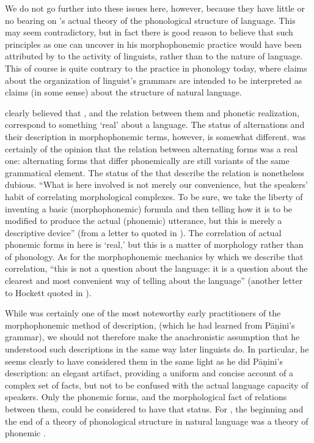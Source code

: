 We do not go further into these issues here, however, because they
have little or no bearing on {\Bloomfield}'s actual theory of the
phonological structure of language. This may seem contradictory, but
in fact there is good reason to believe that such principles as one
can uncover in his morphophonemic practice would have been attributed
by {\Bloomfield} to the activity of linguists, rather than to the nature
of language. This of course is quite contrary to the practice in
phonology today, where claims about the organization of linguist's
grammars are intended to be interpreted as claims (in some sense)
about the structure of natural language.

{\Bloomfield} clearly believed that , and the
relation between them and phonetic realization, correspond to
something `real' about a language. The status of alternations and
their description in morphophonemic terms, however, is somewhat
different. {\Bloomfield} was certainly of the opinion that the relation
between alternating forms was a real one: alternating forms that
differ phonemically are still variants of the same grammatical
element. The status of the  that describe the
relation is nonetheless dubious. ``What is here involved is not merely
our convenience, but the speakers' habit of correlating morphological
complexes. To be sure, we take the liberty of inventing a basic
(morphophonemic) formula and then telling how it is to be modified to
produce the actual (phonemic) utterance, but this is merely a
descriptive device'' (from a letter to {\Hockett} quoted in
\citealt[371]{hockett70:bloomfield.anthology}). The correlation of
actual phonemic forms in  here is `real,' but this is a
matter of morphology rather than of phonology. As for the
morphophonemic mechanics by which we describe that correlation, ``this
is not a question about the language: it is a question about the
clearest and most convenient way of telling about the language''
(another letter to Hockett quoted in
\citealt[375]{hockett70:bloomfield.anthology}).

While {\Bloomfield} was certainly one of the most noteworthy early
practitioners of the morphophonemic method of description, (which he
had learned from Pāṇini's grammar), we should not therefore make the
anachronistic assumption that he understood such descriptions in the
same way later linguists do. In particular, he seems clearly to have
considered them in the same light as he did Pāṇini's description: an
elegant artifact, providing a uniform and concise account of a complex
set of facts, but not to be confused with the actual language capacity
of speakers. Only the phonemic forms, and the morphological fact of
relations between them, could be considered to have that status. For
{\Bloomfield}, the beginning and the end of a theory of phonological
structure in natural language was a theory of phonemic
.

